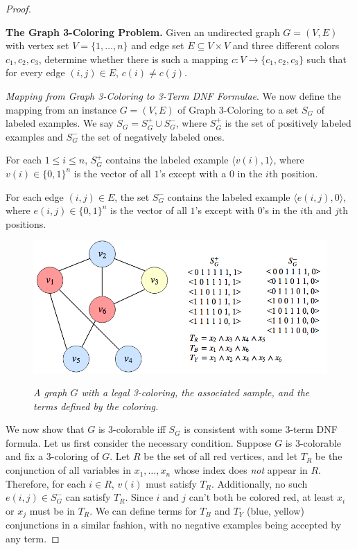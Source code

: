 \documentclass{article}
\begin{document}
\begin{proof}
\begin{framed}
\textbf{The Graph 3-Coloring Problem.} Given an undirected graph $G = (V, E)$
with vertex set $V = \{1, \dots, n\}$ and edge set $E \subseteq V \times V$ and
three different colors $c_1, c_2, c_3$, determine whether there is such a
mapping $c : V \rightarrow \{c_1, c_2, c_3\}$ such that for every edge
$(i, j) \in E$, $c(i) \neq c(j)$.
\end{framed}

\emph{Mapping from Graph 3-Coloring to 3-Term DNF Formulae}. We now define the
mapping from an instance $G = (V,E)$ of Graph 3-Coloring to a set $S_G$ of
labeled examples. We say $S_G = S_G^{+} \cup S_G^{-}$, where $S_G^{+}$ is the
set of positively labeled examples and $S_G^{-}$ the set of negatively labeled
ones.

For each $1 \leq i \leq n$, $S_G^{+}$ contains the labeled example
$\langle v(i), 1 \rangle$, where $v(i) \in \{0, 1\}^n$ is the vector of all
$1$'s except with a $0$ in the $i$th position.

For each edge $(i, j) \in E$, the set $S_G^{-}$ contains the labeled example
$\langle e(i,j), 0 \rangle$, where $e(i,j) \in \{0, 1\}^n$ is the vector of all
$1$'s except with $0$'s in the $i$th and $j$th positions.

\begin{figure}[t]
\begin{center}
\includegraphics[width=\textwidth*7/8]{threecoloring.png}

\emph{A graph $G$ with a legal 3-coloring, the associated sample, and the terms defined by the coloring.}
\end{center}
\end{figure}
We now show that $G$ is 3-colorable iff $S_G$ is consistent with some $3$-term
DNF formula. Let us first consider the necessary condition. Suppose $G$ is
$3$-colorable and fix a $3$-coloring of $G$. Let $R$ be the set of all red
vertices, and let $T_R$ be the conjunction of all variables in $x_1, \dots, x_n$
whose index does \emph{not} appear in $R$. Therefore, for each $i \in R$, $v(i)$
must satisfy $T_R$. Additionally, no such $e(i,j) \in S_G^{-}$ can satisfy $T_R$.
Since $i$ and
$j$ can't both be colored red, at least $x_i$ or $x_j$ must be in $T_R$. We can
define terms for $T_B$ and $T_Y$ (blue, yellow) conjunctions in a similar fashion,
with no negative examples being accepted by any term.


\end{proof}
\end{document}
